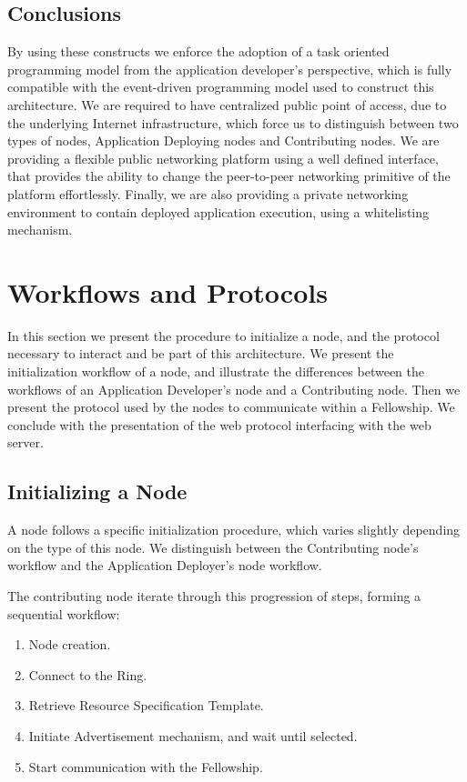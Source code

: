 \documentclass[12pt, titlepage]{uo_temp}
\begin{document}
     \subsection{Conclusions}
     By using these constructs we enforce the adoption of a task oriented programming
     model from the application developer's perspective, which is fully compatible with
     the event-driven programming model used to construct this architecture. We are
     required to have centralized public point of access, due to the underlying Internet
     infrastructure, which force us to distinguish between two types of nodes, Application
     Deploying nodes and Contributing nodes. We are providing a flexible public networking
     platform using a well defined interface, that provides the ability to change the
     peer-to-peer networking primitive of the platform effortlessly. Finally, we are also
     providing a private networking environment to contain deployed application execution,
     using a whitelisting mechanism.

     \section{Workflows and Protocols}
     In this section we present the procedure to initialize a node, and the protocol
     necessary to interact and be part of this architecture. We present the initialization
     workflow of a node, and illustrate the differences between the workflows of an
     Application Developer's node and a Contributing node. Then we present the protocol
     used by the nodes to communicate within a Fellowship. We conclude with the
     presentation of the web protocol interfacing with the web server.

     \subsection{Initializing a Node}
     A node follows a specific initialization procedure, which varies slightly depending
     on the type of this node. We distinguish between the Contributing node's workflow and
     the Application Deployer's node workflow.

     The contributing node iterate through this progression of steps, forming a sequential
     workflow:
     \begin{enumerate}\small
       \item Node creation.
       \item Connect to the Ring.
       \item Retrieve Resource Specification Template.
       \item Initiate Advertisement mechanism, and wait until selected.
       \item Start communication with the Fellowship.
     \end{enumerate}
\end{document}
